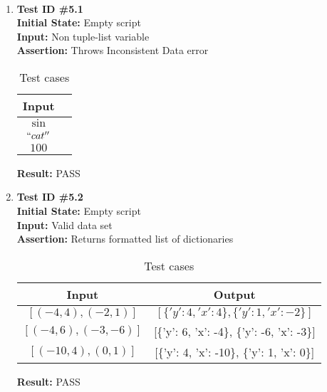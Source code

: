\documentclass[12pt, titlepage]{article}
\begin{document}
	\paragraph{}
		\begin{enumerate}
			\item{\textbf{Test ID \#5.1\\}}
			\textbf{Initial State:} Empty script\\
			\textbf{Input:} Non tuple-list variable\\
			\textbf{Assertion:} Throws Inconsistent Data error\\
			
			\begin{table}[h!]
			  \centering
			  \caption{Test cases}
			  \begin{tabular}{|c|c|}
			  	\toprule
			   	 Input\\
			   	 \midrule
			   	 $\sin$ \\
			   	 $``cat''$ \\
			   	 $100$ \\
			   	 \bottomrule
			  \end{tabular}
			\end{table}
			
			\textbf{Result:} PASS
			
			\item{\textbf{Test ID \#5.2\\}}
			\textbf{Initial State:} Empty script\\
			\textbf{Input:} Valid data set \\
			\textbf{Assertion:} Returns formatted list of dictionaries\\
			\begin{table}[h!]
			  \centering
			  \caption{Test cases}
			  \begin{tabular}{|c|c|}
			  	\toprule
			   	 Input & Output\\
			   	 \midrule
			   	 $[ (-4,4), (-2,1)] $  & $[\{'y':4, 'x':4\}, \{'y':1, 'x':-2\}]$\\
			   	 $[ (-4,6), (-3,-6) ]$ & [\{'y': 6, 'x': -4\}, \{'y': -6, 'x': -3\}]\\
			   	 $[ (-10,4), (0,1) ]$ & [\{'y': 4, 'x': -10\}, \{'y': 1, 'x': 0\}]\\

			   	 \bottomrule
			  \end{tabular}
			\end{table}
			\textbf{Result:} PASS

		\end{enumerate}		
\end{document}
